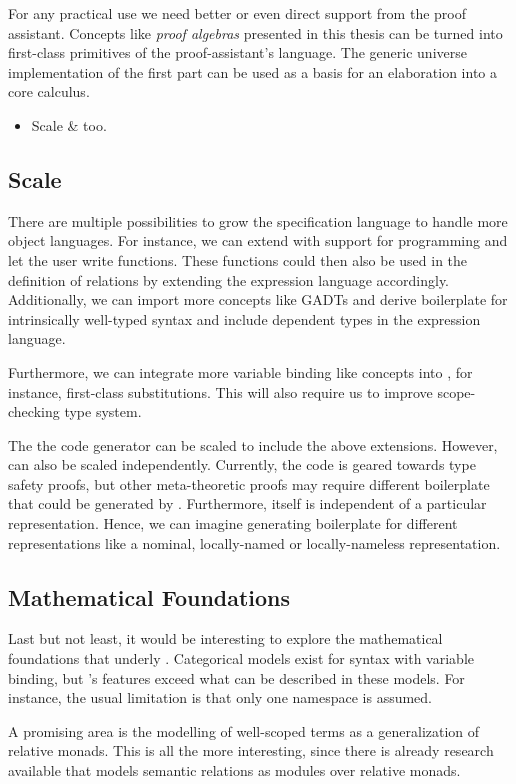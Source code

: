 For any practical use we need better or even direct support from the proof
assistant. Concepts like \emph{proof algebras} presented in this thesis can be
turned into first-class primitives of the proof-assistant's language. The
generic universe implementation of the first part can be used as a basis for an
elaboration into a core calculus.

\begin{itemize}
\item Scale \Needle \& \Knot too.
\end{itemize}

\subsection{Scale}

There are multiple possibilities to grow the \Knot specification language to
handle more object languages. For instance, we can extend \Knot with support for
programming and let the user write functions. These functions could then also be
used in the definition of relations by extending the expression language
accordingly. Additionally, we can import more concepts like GADTs and derive
boilerplate for intrinsically well-typed syntax and include dependent types in
the expression language.

Furthermore, we can integrate more variable binding like concepts into \Knot,
for instance, first-class substitutions. This will also require us to improve
\Knot scope-checking type system.

The \Needle the code generator can be scaled to include the above extensions.
However, \Needle can also be scaled independently. Currently, the code is geared
towards type safety proofs, but other meta-theoretic proofs may require
different boilerplate that could be generated by \Needle. Furthermore, \Knot
itself is independent of a particular representation. Hence, we can imagine
generating boilerplate for different representations like a nominal,
locally-named or locally-nameless representation.


\subsection{Mathematical Foundations}

Last but not least, it would be interesting to explore the mathematical
foundations that underly \Knot. Categorical models exist for syntax with
variable binding, but \Knot's features exceed what can be described in these
models. For instance, the usual limitation is that only one namespace is
assumed.

A promising area is the modelling of well-scoped terms as a generalization of
relative monads. This is all the more interesting, since there is already
research available that models semantic relations as modules over relative monads.
